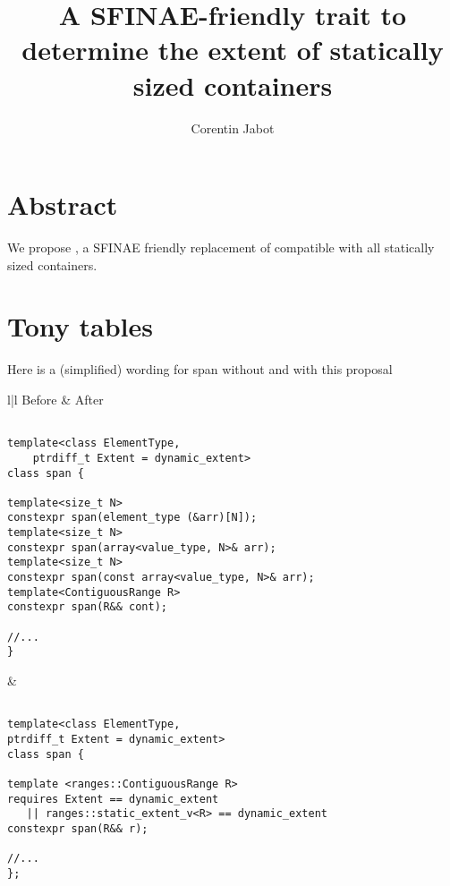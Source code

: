 \documentclass{wg21}
\title{A SFINAE-friendly trait to determine the extent of statically sized containers}
\author{Corentin Jabot}{corentin.jabot@gmail.com}
\begin{document}
\maketitle

\section{Abstract}

We propose , a SFINAE friendly replacement of  compatible with all statically sized containers.

\section{Tony tables}

Here is a (simplified) wording for span without and with this proposal

\begin{center}
\begin{tabular}{l|l}
Before & After\\ \hline

\begin{minipage}[t]{0.5\textwidth}

\begin{verbatim}

template<class ElementType, 
	ptrdiff_t Extent = dynamic_extent>
class span {

template<size_t N>
constexpr span(element_type (&arr)[N]);
template<size_t N>
constexpr span(array<value_type, N>& arr);
template<size_t N>
constexpr span(const array<value_type, N>& arr);
template<ContiguousRange R>
constexpr span(R&& cont);

//...
}
\end{verbatim}
\end{minipage}
&
\begin{minipage}[t]{0.5\textwidth}
\begin{verbatim}

template<class ElementType, 
ptrdiff_t Extent = dynamic_extent>
class span {

template <ranges::ContiguousRange R>
requires Extent == dynamic_extent 
   || ranges::static_extent_v<R> == dynamic_extent
constexpr span(R&& r);

//...
};
\end{verbatim}
\end{minipage}
\\\\ \hline

\end{tabular}
\end{center}
\end{document}
